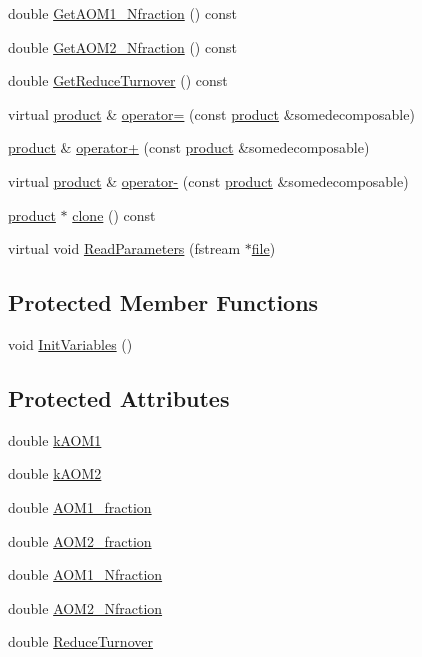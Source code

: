 \begin{DoxyCompactItemize}
\item 
double \hyperlink{classdecomposable_a9de8338cfa6616c44d4385fbf129ab39}{GetAOM1\_\-Nfraction} () const 
\item 
double \hyperlink{classdecomposable_a6bfb17228b49bdce4d57a911b1fab099}{GetAOM2\_\-Nfraction} () const 
\item 
double \hyperlink{classdecomposable_a5df0740211a3624cd45f507fddb7fa3e}{GetReduceTurnover} () const 
\item 
virtual \hyperlink{classproduct}{product} \& \hyperlink{classdecomposable_a296f63c98dd6712bfc375287c6123ea7}{operator=} (const \hyperlink{classproduct}{product} \&somedecomposable)
\item 
\hyperlink{classproduct}{product} \& \hyperlink{classdecomposable_a3ce2092217848b27b52fc54327c8ad53}{operator+} (const \hyperlink{classproduct}{product} \&somedecomposable)
\item 
virtual \hyperlink{classproduct}{product} \& \hyperlink{classdecomposable_a2af3d9d773f8cdf8d84ce51ed5c470ff}{operator-\/} (const \hyperlink{classproduct}{product} \&somedecomposable)
\item 
\hyperlink{classproduct}{product} $\ast$ \hyperlink{classdecomposable_ab15f1f4e93e58810887029648be0ec31}{clone} () const 
\item 
virtual void \hyperlink{classdecomposable_a79e5c1092b6c8f3e9f233a26ed308c63}{ReadParameters} (fstream $\ast$\hyperlink{classbase_a3af52ee9891719d09b8b19b42450b6f6}{file})
\end{DoxyCompactItemize}
\subsection*{Protected Member Functions}
\begin{DoxyCompactItemize}
\item 
void \hyperlink{classdecomposable_aabfa1610321f138dff27b27e074cf9ea}{InitVariables} ()
\end{DoxyCompactItemize}
\subsection*{Protected Attributes}
\begin{DoxyCompactItemize}
\item 
double \hyperlink{classdecomposable_a5b4aff39ba4d423eeffc4515ef5cea2a}{kAOM1}
\item 
double \hyperlink{classdecomposable_aafe6099ccfe324ee3c2e2437e181cf49}{kAOM2}
\item 
double \hyperlink{classdecomposable_a273056446ce0c9b4d36d75f5d2cfd511}{AOM1\_\-fraction}
\item 
double \hyperlink{classdecomposable_a22d9bf36c509a8cad1f0d7436f2a38f5}{AOM2\_\-fraction}
\item 
double \hyperlink{classdecomposable_a3be10faa0acdfb1eba972eec222cdac9}{AOM1\_\-Nfraction}
\item 
double \hyperlink{classdecomposable_ae93cd4d9e67eedb64409c38bb8d4dbef}{AOM2\_\-Nfraction}
\item 
double \hyperlink{classdecomposable_a164e873eb8d7c67064d143578f77a886}{ReduceTurnover}
\end{DoxyCompactItemize}
